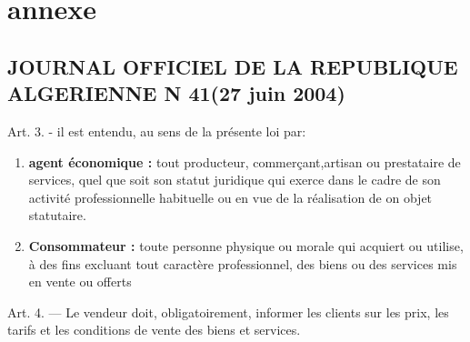 \documentclass[edit,12pt,a4paper,ChapStyle,oneside,doubleinterligne]{report}
\begin{document}
\chapter*{annexe}
\section*{JOURNAL OFFICIEL DE LA  REPUBLIQUE ALGERIENNE N 41(27 juin 2004)}
Art. 3. - il est entendu, au sens de la présente loi par:
\begin{enumerate}
    \item \textbf{agent économique :} tout producteur, commerçant,artisan ou prestataire de services, quel que soit son statut juridique qui exerce dans le cadre de son activité professionnelle habituelle ou en vue de la réalisation de on objet statutaire.
    \item \textbf{Consommateur :} toute personne physique ou morale qui acquiert ou utilise, à des fins excluant tout caractère professionnel, des biens ou des services mis en vente ou offerts
\end{enumerate}
Art. 4. — Le vendeur doit, obligatoirement, informer les clients sur les prix, les tarifs et les conditions de vente des biens et services.\cite{journal41}
\end{document}
